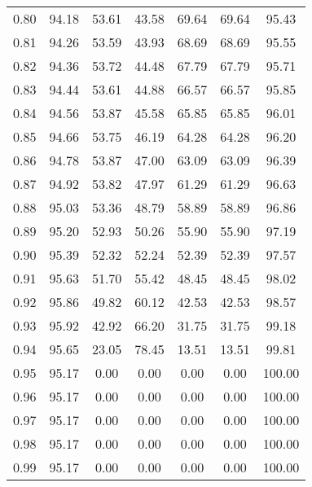 \begin{tabular}{|c|c|c|c|c|c|c|}
      0.80 &     94.18 &     53.61 &      43.58 &   69.64 &      69.64 &         95.43 \\
      0.81 &     94.26 &     53.59 &      43.93 &   68.69 &      68.69 &         95.55 \\
      0.82 &     94.36 &     53.72 &      44.48 &   67.79 &      67.79 &         95.71 \\
      0.83 &     94.44 &     53.61 &      44.88 &   66.57 &      66.57 &         95.85 \\
      0.84 &     94.56 &     53.87 &      45.58 &   65.85 &      65.85 &         96.01 \\
      0.85 &     94.66 &     53.75 &      46.19 &   64.28 &      64.28 &         96.20 \\
      0.86 &     94.78 &     53.87 &      47.00 &   63.09 &      63.09 &         96.39 \\
      0.87 &     94.92 &     53.82 &      47.97 &   61.29 &      61.29 &         96.63 \\
      0.88 &     95.03 &     53.36 &      48.79 &   58.89 &      58.89 &         96.86 \\
      0.89 &     95.20 &     52.93 &      50.26 &   55.90 &      55.90 &         97.19 \\
      0.90 &     95.39 &     52.32 &      52.24 &   52.39 &      52.39 &         97.57 \\
      0.91 &     95.63 &     51.70 &      55.42 &   48.45 &      48.45 &         98.02 \\
      0.92 &     95.86 &     49.82 &      60.12 &   42.53 &      42.53 &         98.57 \\
      0.93 &     95.92 &     42.92 &      66.20 &   31.75 &      31.75 &         99.18 \\
      0.94 &     95.65 &     23.05 &      78.45 &   13.51 &      13.51 &         99.81 \\
      0.95 &     95.17 &      0.00 &       0.00 &    0.00 &       0.00 &        100.00 \\
      0.96 &     95.17 &      0.00 &       0.00 &    0.00 &       0.00 &        100.00 \\
      0.97 &     95.17 &      0.00 &       0.00 &    0.00 &       0.00 &        100.00 \\
      0.98 &     95.17 &      0.00 &       0.00 &    0.00 &       0.00 &        100.00 \\
      0.99 &     95.17 &      0.00 &       0.00 &    0.00 &       0.00 &        100.00 \\
\bottomrule
\end{tabular}
